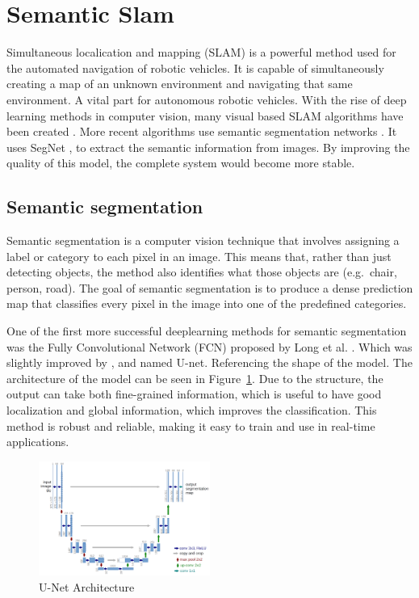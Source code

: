 \section{Semantic Slam}
Simultaneous localication and mapping (SLAM)\cite{chatila1985position} is a powerful method used for the automated navigation of robotic vehicles. It is capable of simultaneously creating a map of an unknown environment and navigating that same environment. A vital part for autonomous robotic vehicles. With the rise of deep learning methods in computer vision, many visual based SLAM algorithms have been created \cite{taketomi2017visual}. More recent algorithms use semantic segmentation networks \cite{yu2018ds}. It uses SegNet \cite{badri2017segnet}, to extract the semantic information from images. By improving the quality of this model, the complete system would become more stable.

\subsection{Semantic segmentation}
Semantic segmentation is a computer vision technique that involves assigning a label or category to each pixel in an image. This means that, rather than just detecting objects, the method also identifies what those objects are (e.g.\, chair, person, road). The goal of semantic segmentation is to produce a dense prediction map that classifies every pixel in the image into one of the predefined categories.

One of the first more successful deeplearning methods for semantic segmentation was the Fully Convolutional Network (FCN) proposed by Long et al. \cite{long2015fully}. Which was slightly improved by \cite{ronneberger2015u}, and named U-net. Referencing the shape of the model. The architecture of the model can be seen in Figure~\ref{fig:unet-architecture}. Due to the structure, the output can take both fine-grained information, which is useful to have good localization and global information, which improves the classification. This method is robust and reliable, making it easy to train and use in real-time applications.
\begin{figure}[ht]
    \centering
    \includegraphics[width=0.5\textwidth]{figures/unet-architecture.png}
    \caption{U-Net Architecture \cite{ronneberger2015u}}
    \label{fig:unet-architecture}
\end{figure}

